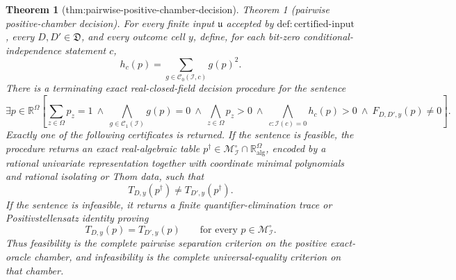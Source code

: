 \documentclass{article}
\newtheorem{theorem}{Theorem}
\begin{document}
\begin{theorem}[thm:pairwise-positive-chamber-decision]\label{thm:pairwise-positive-chamber-decision}
Theorem 1 (pairwise positive-chamber decision).  For every finite input \(\mathfrak u\) accepted by \(\mathrm{def{:}certified\text{-}input}\), every \(D,D'\in\mathfrak D\), and every outcome cell \(y\), define, for each bit-zero conditional-independence statement \(c\),
\[
 h_c(p)=\sum_{g\in\mathcal C_0(\mathcal I,c)}g(p)^2.
\]
There is a terminating exact real-closed-field decision procedure for the sentence
\[
 \exists p\in\mathbb R^\Omega\left[
 \sum_{z\in\Omega}p_z=1
 \ \wedge\ 
 \bigwedge_{g\in\mathcal C_1(\mathcal I)}g(p)=0
 \ \wedge\ 
 \bigwedge_{z\in\Omega}p_z>0
 \ \wedge\ 
 \bigwedge_{c:\mathcal I(c)=0}h_c(p)>0
 \ \wedge\ 
 F_{D,D',y}(p)\neq0
 \right].
\]
Exactly one of the following certificates is returned.  If the sentence is feasible, the procedure returns an exact real-algebraic table \(p^\dagger\in\mathcal M_{\mathcal I}^{\circ}\cap\mathbb R_{\mathrm{alg}}^\Omega\), encoded by a rational univariate representation together with coordinate minimal polynomials and rational isolating or Thom data, such that
\[
 T_{D,y}(p^\dagger)\neq T_{D',y}(p^\dagger).
\]
If the sentence is infeasible, it returns a finite quantifier-elimination trace or Positivstellensatz identity proving
\[
 T_{D,y}(p)=T_{D',y}(p)
 \qquad\text{for every }p\in\mathcal M_{\mathcal I}^{\circ}.
\]
Thus feasibility is the complete pairwise separation criterion on the positive exact-oracle chamber, and infeasibility is the complete universal-equality criterion on that chamber.
\end{theorem}
\end{document}
